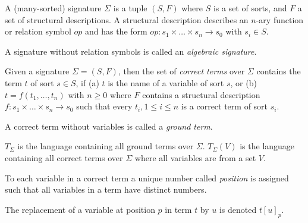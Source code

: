 \documentclass[
    a4paper,
    12pt,
    twoside,
    BCOR=12mm,
    parskip=half,
    chapterprefix,
    numbers=noenddot,
    bibliography=totoc
]{scrbook}
\begin{document}
\begin{definition}
  \label{def:signature}
	A (many-sorted) signature $\Sigma$ is a tuple $(S,F)$ where $S$ is a set of sorts, and $F$ a set of structural descriptions. A structural description describes an $n$-ary function or relation symbol $op$ and has the form $op: s_1 \times \ldots \times s_n \to s_0$ with $s_i \in S$.
\end{definition}

\begin{definition}
  \label{def:alg_signature}
	A signature without relation symbols is called an \emph{algebraic signature}.
\end{definition}

\begin{definition}
  \label{def:correct_terms}
	Given a signature $\Sigma =(S,F)$, then the set of \emph{correct terms} over $\Sigma$ contains the term $t$ of sort $s \in S$, if (a) $t$ is the name of a variable of sort $s$, or (b) $t = f (t_1,\ldots,t_n)$ with $n \geq 0$ where $F$ contains a structural description $f : s_1 \times \ldots \times s_n \to s_0$ such that every $t_i, 1 \leq i \leq n$ is a correct term of sort $s_i$.
\end{definition}

\begin{definition}
  \label{def:ground_term}
	A correct term without variables is called a \emph{ground term}.
\end{definition}

$T_\Sigma$ is the language containing all ground terms over $\Sigma$.
$T_\Sigma(V)$ is the language containing all correct terms over $\Sigma$ where all variables are from a set $V$.

\begin{definition}
	To each variable in a correct term a unique number called \emph{position} is assigned such that all variables in a term have distinct numbers.
\end{definition}

\pagebreak

\begin{definition}
	The replacement of a variable at position $p$ in term $t$ by $u$ is denoted $t[u]_p$.
\end{definition}
\end{document}
